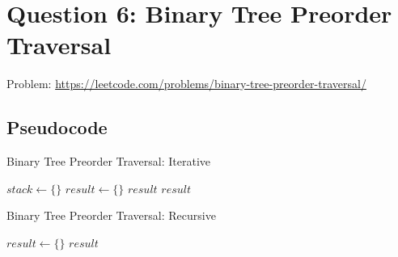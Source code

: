 \documentclass[11pt]{article}
\begin{document}
\newpage

\section{Question 6: Binary Tree Preorder Traversal}
Problem: \url{https://leetcode.com/problems/binary-tree-preorder-traversal/}

\subsection{Pseudocode}


\begin{algorithm}[H]
    \caption{Binary Tree Preorder Traversal: Iterative}
    \begin{algorithmic}
            \State $stack \gets \{\}$
            \State $result \gets \{\}$
                \State \Return $result$
            \EndIf
            \State {}
            \State {}
                \State {}
                \State {}
                    \State {}
                \EndIf
                    \State {}
                \EndIf
            \EndWhile
            \State \Return $result$
        \EndFunction
    \end{algorithmic}
\end{algorithm}


\begin{algorithm}[H]
    \caption{Binary Tree Preorder Traversal: Recursive}
    \begin{algorithmic}
            \State $result \gets \{\}$
            \State {}
            \State \Return $result$
        \EndFunction
                \State \Return
            \EndIf
            \State {}
            \State {}
            \State {}
        \EndFunction
    \end{algorithmic}
\end{algorithm}
\end{document}
